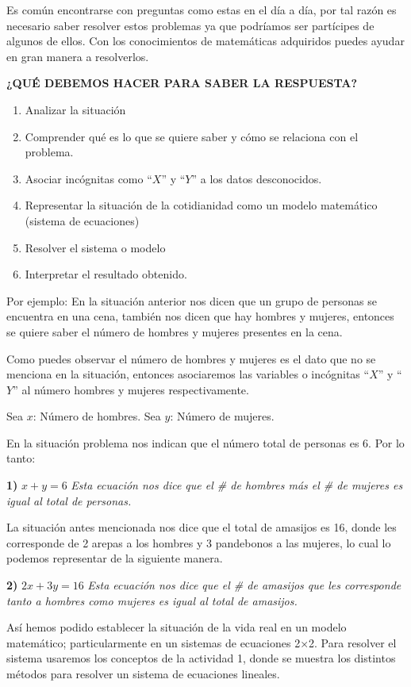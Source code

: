 \documentclass[12pt,a4paper]{article}
\begin{document}
Es común encontrarse con preguntas como estas en el día a día, por tal razón es necesario saber resolver estos problemas ya que podríamos ser partícipes de algunos de ellos. Con los conocimientos de matemáticas adquiridos puedes ayudar en gran manera a resolverlos.

\textbf{¿QUÉ DEBEMOS HACER PARA SABER LA RESPUESTA?}

\begin{enumerate}
    \item Analizar la situación
    \item Comprender qué es lo que se quiere saber y cómo se relaciona con el problema.
    \item Asociar incógnitas como ``$X$'' y ``$Y$'' a los datos desconocidos.
    \item Representar la situación de la cotidianidad como un modelo matemático (sistema de ecuaciones)
    \item Resolver el sistema o modelo
    \item Interpretar el resultado obtenido.
\end{enumerate}

Por ejemplo: En la situación anterior nos dicen que un grupo de personas se encuentra en una cena, también nos dicen que hay hombres y mujeres, entonces se quiere saber el número de hombres y mujeres presentes en la cena.

Como puedes observar el número de hombres y mujeres es el dato que no se menciona en la situación, entonces asociaremos las variables o incógnitas ``$X$'' y ``$Y$'' al número hombres y mujeres respectivamente.

Sea $x$: Número de hombres. \quad Sea $y$: Número de mujeres.

En la situación problema nos indican que el número total de personas es 6. Por lo tanto:

\textbf{1)} $x + y = 6$ \quad \textit{Esta ecuación nos dice que el \# de hombres más el \# de mujeres es igual al total de personas.}

La situación antes mencionada nos dice que el total de amasijos es 16, donde les corresponde de 2 arepas a los hombres y 3 pandebonos a las mujeres, lo cual lo podemos representar de la siguiente manera.

\textbf{2)} $2x + 3y = 16$ \quad \textit{Esta ecuación nos dice que el \# de amasijos que les corresponde tanto a hombres como mujeres es igual al total de amasijos.}

Así hemos podido establecer la situación de la vida real en un modelo matemático; particularmente en un sistemas de ecuaciones 2×2. Para resolver el sistema usaremos los conceptos de la actividad 1, donde se muestra los distintos métodos para resolver un sistema de ecuaciones lineales.
\end{document}
